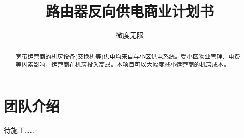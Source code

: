\documentclass[12pt,a4paper]{report}
\title{路由器反向供电商业计划书}
\author{微度无限}
\begin{document}
\maketitle
\tableofcontents


\renewcommand{\abstractname}{摘\quad 要}
\begin{abstract}
宽带运营商的机房设备(交换机等)供电均来自与小区供电系统。受小区物业管理、电费等因素影响，运营商在机房投入高昂。本项目可以大幅度减小运营商的机房成本。
\end{abstract}

\chapter{团队介绍}
待施工……
\end{document}
